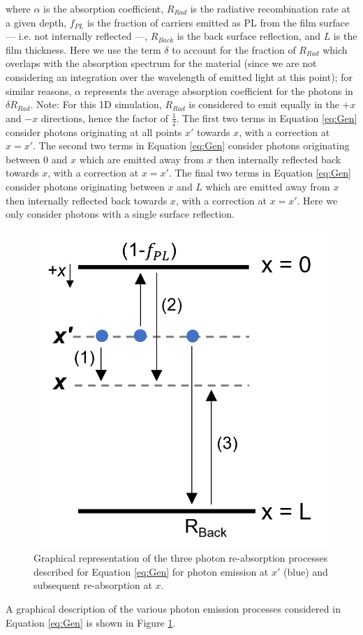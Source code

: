 \documentclass[11pt]{article}
\begin{document}
\par where $ \alpha $ is the absorption coefficient, $ R_{Rad} $ is the radiative recombination rate at a given depth, $ f_{PL} $ is the fraction of carriers emitted as PL from the film surface --- i.e. not internally reflected ---, $ R_{Back} $ is the back surface reflection, and $ L $ is the film thickness. Here we use the term $ \delta $ to account for the fraction of $ R_{Rad} $ which overlaps with the absorption spectrum for the material (since we are not considering an integration over the wavelength of emitted light at this point); for similar reasons, $ \alpha $ represents the average absorption coefficient for the photons in $ \delta R_{Rad} $. Note: For this 1D simulation, $ R_{Rad} $ is considered to emit equally in the $ +x $ and $ -x $ directions, hence the factor of $ \frac{1}{2} $. The first two terms in Equation \ref{eq:Gen} consider photons originating at all points $ x' $ towards $ x $, with a correction at $ x = x' $. The second two terms in Equation \ref{eq:Gen} consider photons originating between $ 0 $ and $ x $ which are emitted away from $ x $ then internally reflected back towards $ x $, with a correction at $ x = x' $. The final two terms in Equation \ref{eq:Gen} consider photons originating between $ x $ and $ L $ which are emitted away from $ x $ then internally reflected back towards $ x $, with a correction at $ x = x' $. Here we only consider photons with a single surface reflection.

\begin{figure}[h]
	\label{fig:Gen}
	\centering
	\includegraphics[width=0.3\linewidth]{"Images/Gen"}
	\caption{Graphical representation of the three photon re-absorption processes described for Equation \ref{eq:Gen} for photon emission at $ x' $ (blue) and subsequent re-absorption at $ x $.}
	\label{fig:Gen}
\end{figure}

\par A graphical description of the various photon emission processes considered in Equation \ref{eq:Gen} is shown in Figure \ref{fig:Gen}. 
\end{document}
